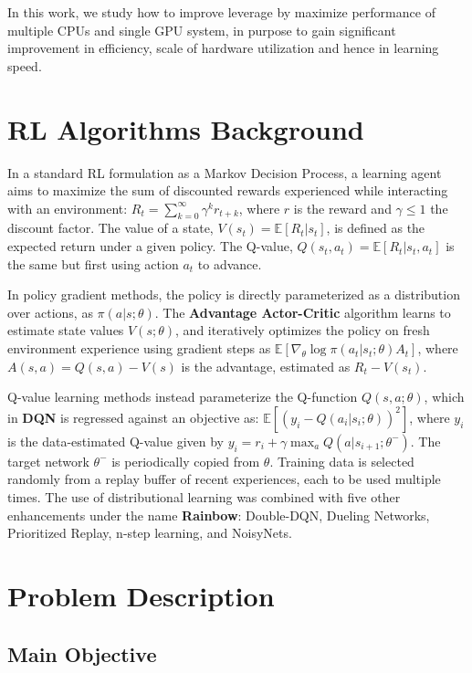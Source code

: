 \documentclass[11 pt, twocolumn]{article}
\begin{document}
In this work, we study how to improve leverage by maximize performance of multiple CPUs and single GPU system, in purpose to gain significant improvement in efficiency, scale of hardware utilization and hence in learning speed.


\section{RL Algorithms Background}
In a standard RL formulation as a Markov Decision Process, a learning agent aims to maximize the sum of discounted rewards experienced while interacting with an environment:
$R_t=\sum_{k=0}^\infty{\gamma^k r_{t+k}}$, where $r$ is the reward and $\gamma\leq 1$ the discount factor. The value of a state, $V(s_t)=\mathbb{E}\left[R_t|s_t\right]$, is defined as the expected return under a given policy.  The Q-value, $Q(s_t,a_t)=\mathbb{E}\left[R_t|s_t,a_t\right]$ is the same but first using action $a_t$ to advance.

In policy gradient methods, the policy is directly parameterized as a distribution over actions, as $\pi(a|s;\theta)$. The \textbf{Advantage Actor-Critic} algorithm learns to estimate state values $V(s;\theta)$, and iteratively optimizes the policy on fresh environment experience using gradient steps as $\mathbb{E}\left[\nabla_\theta\log\pi(a_t|s_t;\theta)A_t\right]$, where $A(s,a)=Q(s,a)-V(s)$ is the advantage, estimated as $R_t - V(s_t)$.

Q-value learning methods instead parameterize the Q-function $Q(s,a;\theta)$, which in \textbf{DQN} is regressed against an objective as: $\mathbb{E}[\left(y_i-Q(a_i|s_i;\theta)\right)^2]$, where $y_i$ is the data-estimated Q-value given by $y_i=r_i + \gamma \max_a Q(a|s_{i+1};\theta^-)$.  The target network $\theta^-$ is periodically copied from $\theta$.  Training data is selected randomly from a replay buffer of recent experiences, each to be used multiple times. The use of distributional learning was combined with five other enhancements under the name \textbf{Rainbow}: Double-DQN, Dueling Networks, Prioritized Replay, n-step learning, and NoisyNets.


\section{Problem Description}

\subsection{Main Objective}
\end{document}
